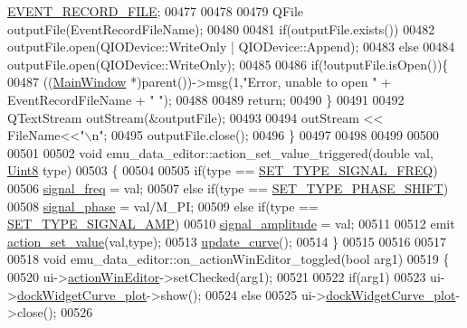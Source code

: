 \begin{DoxyCode}
      \hyperlink{a00110_a8d4ad2cd60e024f6e0f37dbac40768a1}{EVENT\_RECORD\_FILE};
00477 
00478 
00479        QFile outputFile(EventRecordFileName);
00480 
00481        \textcolor{keywordflow}{if}(outputFile.exists())
00482        outputFile.open(QIODevice::WriteOnly | QIODevice::Append);
00483        \textcolor{keywordflow}{else}
00484        outputFile.open(QIODevice::WriteOnly);
00485 
00486        \textcolor{keywordflow}{if}(!outputFile.isOpen())\{
00487            ((\hyperlink{a00017}{MainWindow} *)parent())->msg(1,\textcolor{stringliteral}{"Error, unable to open "} + EventRecordFileName + \textcolor{stringliteral}{" "});
00488 
00489             \textcolor{keywordflow}{return};
00490        \}
00491 
00492        QTextStream outStream(&outputFile);
00493 
00494        outStream << FileName<<\textcolor{stringliteral}{"\(\backslash\)n"};
00495        outputFile.close();
00496 \}
00497 
00498 
00499 
00500 
00501 
00502 \textcolor{keywordtype}{void} emu\_data\_editor::action\_set\_value\_triggered(\textcolor{keywordtype}{double} val, \hyperlink{a00004_a979e3e23b9a449e69ab6a8a83b6042f8}{Uint8} type)
00503 \{
00504 
00505     \textcolor{keywordflow}{if}(type == \hyperlink{a00090_ac1c2065e42f20c51064c84c0db23e9f5}{SET\_TYPE\_SIGNAL\_FREQ})
00506         \hyperlink{a00008_a67039999d520fc483fab521fae5ddde4}{signal\_freq} = val;
00507     \textcolor{keywordflow}{else} \textcolor{keywordflow}{if}(type == \hyperlink{a00090_ada31d976cd5e22a05ba8ff5e80c16d06}{SET\_TYPE\_PHASE\_SHIFT})
00508         \hyperlink{a00008_af08de88fdfe283086e3cca97a2965678}{signal\_phase} = val/M\_PI;
00509     \textcolor{keywordflow}{else} \textcolor{keywordflow}{if}(type == \hyperlink{a00090_a32500d8cf5fb09339cc8f97d52206b41}{SET\_TYPE\_SIGNAL\_AMP})
00510         \hyperlink{a00008_a73dabe63bd74afe2776e8136211dc36e}{signal\_amplitude} = val;
00511 
00512     emit \hyperlink{a00008_a7c1fa0d7d1623b11d4badceb1854010e}{action\_set\_value}(val,type);
00513     \hyperlink{a00008_a15cbcf5f0a17281468800f47898f60c1}{update\_curve}();
00514 \}
00515 
00516 
00517 
00518 \textcolor{keywordtype}{void} emu\_data\_editor::on\_actionWinEditor\_toggled(\textcolor{keywordtype}{bool} arg1)
00519 \{
00520      ui->\hyperlink{a00079_aa5d56420958ab4fd1239e29714d75e18}{actionWinEditor}->setChecked(arg1);
00521 
00522      \textcolor{keywordflow}{if}(arg1)
00523          ui->\hyperlink{a00079_a0edc87fb115fede171c0da1f99000874}{dockWidgetCurve\_plot}->show();
00524      \textcolor{keywordflow}{else}
00525          ui->\hyperlink{a00079_a0edc87fb115fede171c0da1f99000874}{dockWidgetCurve\_plot}->close();
00526 

\end{DoxyCode}
